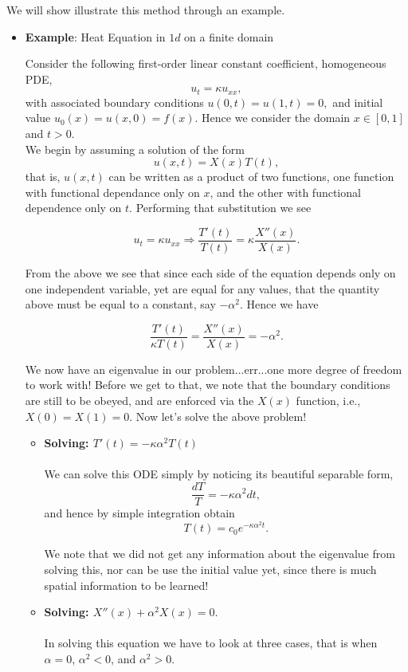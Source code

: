 We will show illustrate this method through an example.

\begin{itemize}
\item[] {\bf{Example}}: Heat Equation in $1d$ on a finite domain

Consider the following first-order linear constant coefficient, homogeneous PDE, $$u_t = \kappa u_{xx},$$ with associated boundary conditions $u(0,t)=u(1,t)=0,$ and initial value $u_0(x)=u(x,0) = f(x)$. Hence we consider the domain $x\in[0,1]$ and $t>0$. \\

We begin by assuming a solution of the form $$u(x,t)=X(x)T(t),$$ that is, $u(x,t)$ can be written as a product of two functions, one function with functional dependance only on $x$, and the other with functional dependence only on $t$. Performing that substitution we see 

$$u_t = \kappa u_{xx} \Rightarrow \frac{T'(t)}{T(t)} = \kappa \frac{X''(x)}{X(x)}.$$

From the above we see that since each side of the equation depends only on one independent variable, yet are equal for any values, that the quantity above must be equal to a constant, say $-\alpha^2.$ Hence we have 

$$\frac{T'(t)}{\kappa T(t)} =  \frac{X''(x)}{X(x)} = -\alpha^2.$$

We now have an eigenvalue in our problem...err...one more degree of freedom to work with! Before we get to that, we note that the boundary conditions are still to be obeyed, and are enforced via the $X(x)$ function, i.e., $ X(0)=X(1)=0.$ Now let's solve the above problem!\\

\begin{itemize}

\item[] {\bf{Solving: $T'(t) = - \kappa\alpha^2 T(t)$}} \\ \\
We can solve this ODE simply by noticing its beautiful separable form, 
$$\frac{dT}{T} = -\kappa\alpha^2 dt,$$
and hence by simple integration obtain
$$T(t) = c_0 e^{-\kappa\alpha^2 t}.$$

We note that we did not get any information about the eigenvalue from solving this, nor can be use the initial value yet, since there is much spatial information to be learned! \\

\item[] {\bf{Solving: $X''(x) + \alpha^2 X(x) = 0.$}} \\ \\
In solving this equation we have to look at three cases, that is when $\alpha=0$, $\alpha^2 < 0$, and $\alpha^2>0.$\\
\begin{enumerate}


\end{enumerate}
\end{itemize}
\end{itemize}
